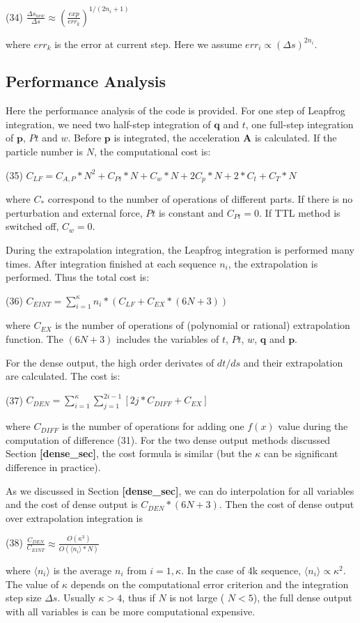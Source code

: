 (34) $ \frac{\Delta s_{new}}{\Delta s} \approx \left(\frac{exp}{err_{k}}\right)^{1/(2n_i+1)} $

where $ err_{k} $ is the error at current step. Here we assume $ err_i \propto (\Delta s)^{2n_i} $.\hypertarget{index_perf_sec}{}\subsection{Performance Analysis}\label{index_perf_sec}
Here the performance analysis of the code is provided. For one step of Leapfrog integration, we need two half-\/step integration of $ \mathbf{q} $ and $ t $, one full-\/step integration of $ \mathbf{p} $, $ Pt $ and $ w $. Before $ \mathbf{p} $ is integrated, the acceleration $ \mathbf{A} $ is calculated. If the particle number is $ N $, the computational cost is\+:

(35) $ C_{LF} = C_{A,P}*N^2 + C_{Pt}*N + C_{w}*N + 2C_{p}*N + 2*C_{t} + C_{T}*N $

where $ C_* $ correspond to the number of operations of different parts. If there is no perturbation and external force, $ Pt $ is constant and $ C_{Pt} = 0$. If T\+TL method is switched off, $ C_{w} = 0$.

During the extrapolation integration, the Leapfrog integration is performed many times. After integration finished at each sequence $ n_i $, the extrapolation is performed. Thus the total cost is\+:

(36) $ C_{EINT} = \sum_{i=1}^\kappa n_i*(C_{LF} + C_{EX}*(6N+3))$

where $ C_{EX} $ is the number of operations of (polynomial or rational) extrapolation function. The $ (6N+3) $ includes the variables of $ t $, $ Pt $, $ w $, $ \mathbf{q} $ and $ \mathbf{p} $.

For the dense output, the high order derivates of $ dt/ds $ and their extrapolation are calculated. The cost is\+:

(37) $ C_{DEN} = \sum_{i=1}^\kappa \sum_{j=1}^{2i-1} [2j*C_{DIFF} + C_{EX}] $

where $ C_{DIFF} $ is the number of operations for adding one $ f(x) $ value during the computation of difference (31). For the two dense output methods discussed Section {\bfseries [dense\+\_\+sec]}, the cost formula is similar (but the $ \kappa $ can be significant difference in practice).

As we discussed in Section {\bfseries [dense\+\_\+sec]}, we can do interpolation for all variables and the cost of dense output is $ C_{DEN}*(6N+3) $. Then the cost of dense output over extrapolation integration is

(38) $ \frac{C_{DEN}}{C_{EINT}} \approx \frac{O(\kappa^3)}{O(\langle n_i\rangle*N)} $

where $\langle n_i\rangle$ is the average $ n_i $ from $ i=1,\kappa$. In the case of 4k sequence, $\langle n_i\rangle \propto \kappa^2$. The value of $\kappa$ depends on the computational error criterion and the integration step size $ \Delta s$. Usually $ \kappa>4 $, thus if $ N $ is not large ( $ N < 5 $), the full dense output with all variables is can be more computational expensive. 